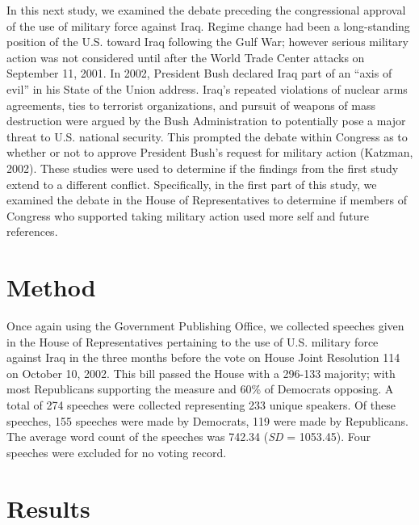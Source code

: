 \documentclass[english,,man,floatsintext]{apa6}
\begin{document}
In this next study, we examined the debate preceding the congressional approval of the use of military force against Iraq. Regime change had been a long-standing position of the U.S. toward Iraq following the Gulf War; however serious military action was not considered until after the World Trade Center attacks on September 11, 2001. In 2002, President Bush declared Iraq part of an \enquote{axis of evil} in his State of the Union address. Iraq's repeated violations of nuclear arms agreements, ties to terrorist organizations, and pursuit of weapons of mass destruction were argued by the Bush Administration to potentially pose a major threat to U.S. national security. This prompted the debate within Congress as to whether or not to approve President Bush's request for military action (Katzman, 2002). These studies were used to determine if the findings from the first study extend to a different conflict. Specifically, in the first part of this study, we examined the debate in the House of Representatives to determine if members of Congress who supported taking military action used more self and future references.

\hypertarget{method-3}{%
\section{Method}\label{method-3}}

Once again using the Government Publishing Office, we collected speeches given in the House of Representatives pertaining to the use of U.S. military force against Iraq in the three months before the vote on House Joint Resolution 114 on October 10, 2002. This bill passed the House with a 296-133 majority; with most Republicans supporting the measure and 60\% of Democrats opposing. A total of 274 speeches were collected representing 233 unique speakers. Of these speeches, 155 speeches were made by Democrats, 119 were made by Republicans. The average word count of the speeches was 742.34 (\emph{SD} = 1053.45). Four speeches were excluded for no voting record.

\hypertarget{results-2}{%
\section{Results}\label{results-2}}
\end{document}
